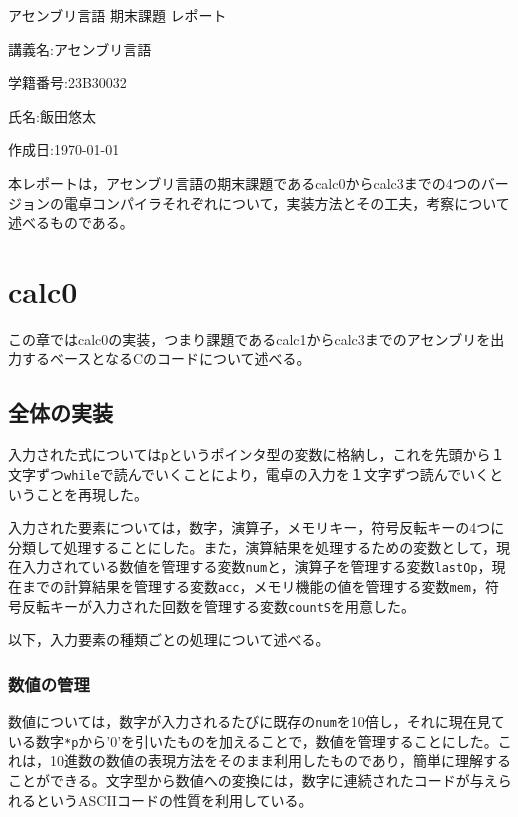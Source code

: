 \documentclass[a4paper]{jsarticle}
\newcommand{\var}[1]{\texttt{#1}}
\begin{document}
\begin{titlepage}
\begin{center}
\vspace*{150truept}
{\huge アセンブリ言語 期末課題 レポート}\par
\vspace{50truept}
{\large 講義名:アセンブリ言語}\par
\vspace{5truept}
{\large 学籍番号:23B30032}\par
\vspace{5truept}
{\large 氏名:飯田悠太}\par
\vspace{5truept}
{\large 作成日:\today}
\end{center}
\end{titlepage}
本レポートは，アセンブリ言語の期末課題であるcalc0からcalc3までの4つのバージョンの電卓コンパイラそれぞれについて，実装方法とその工夫，考察について述べるものである。
\section{calc0}
この章ではcalc0の実装，つまり課題であるcalc1からcalc3までのアセンブリを出力するベースとなるCのコードについて述べる。
\subsection{全体の実装}
入力された式については\var{p}というポインタ型の変数に格納し，これを先頭から１文字ずつ\var{while}で読んでいくことにより，電卓の入力を１文字ずつ読んでいくということを再現した。

入力された要素については，数字，演算子，メモリキー，符号反転キーの4つに分類して処理することにした。また，演算結果を処理するための変数として，現在入力されている数値を管理する変数\var{num}と，演算子を管理する変数\var{lastOp}，現在までの計算結果を管理する変数\var{acc}，メモリ機能の値を管理する変数\var{mem}，符号反転キーが入力された回数を管理する変数\var{countS}を用意した。

以下，入力要素の種類ごとの処理について述べる。
\subsubsection{数値の管理}
数値については，数字が入力されるたびに既存の\var{num}を10倍し，それに現在見ている数字\var{*p}から'0'を引いたものを加えることで，数値を管理することにした。これは，10進数の数値の表現方法をそのまま利用したものであり，簡単に理解することができる。文字型から数値への変換には，数字に連続されたコードが与えられるというASCIIコードの性質を利用している。
\end{document}
